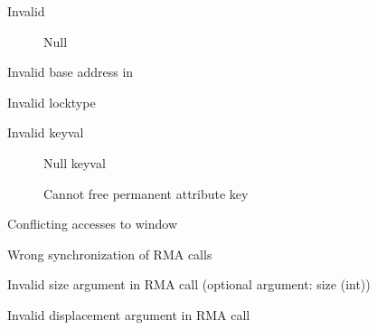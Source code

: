 \begin{description}
\item[]Invalid 
    \begin{description}
    \item[]Null 
    \end{description}
\item[]Invalid base address in 
\item[]Invalid locktype
\item[]Invalid keyval
    \begin{description}
    \item[]Null keyval
    \item[]Cannot free permanent
      attribute key
    \end{description}
\item[]Conflicting accesses to window
\item[]Wrong synchronization of RMA calls
\item[]Invalid size argument in RMA call (optional
  argument: size (int))
\item[]Invalid displacement argument in RMA call

\end{description}
